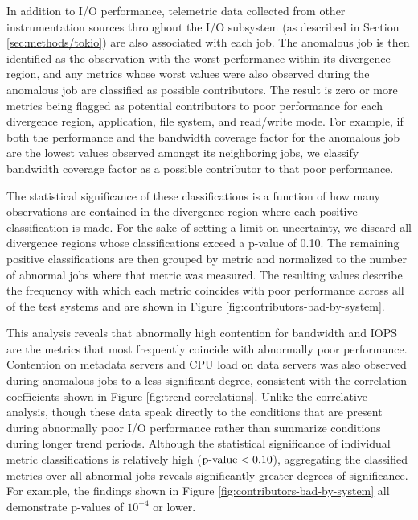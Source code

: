 In addition to I/O performance, telemetric data collected from other instrumentation sources throughout the I/O subsystem (as described in Section \ref{sec:methods/tokio}) are also associated with each job.
The anomalous job is then identified as the observation with the worst performance within its divergence region, and any metrics whose worst values were also observed during the anomalous job are classified as possible contributors.
The result is zero or more metrics being flagged as potential contributors to poor performance for each divergence region, application, file system, and read/write mode. For example, if both the performance and the bandwidth coverage factor for the anomalous job are the lowest values observed amongst its neighboring jobs, we classify bandwidth coverage factor as a possible contributor to that poor performance.


The statistical significance of these classifications is a function of how many observations are contained in the divergence region where each positive classification is made.
For the sake of setting a limit on uncertainty, we discard all divergence regions whose classifications exceed a p-value of 0.10. 
The remaining positive classifications are then grouped by metric and normalized to the number of abnormal jobs where that metric was measured.
The resulting values describe the frequency with which each metric coincides with poor performance across all of the test systems and are shown in Figure \ref{fig:contributors-bad-by-system}.

This analysis reveals that abnormally high contention for bandwidth and IOPS are the metrics that most frequently coincide with abnormally poor performance.
Contention on metadata servers and CPU load on data servers was also observed during anomalous jobs to a less significant degree, consistent with the correlation coefficients shown in Figure \ref{fig:trend-correlations}.
Unlike the correlative analysis, though these data speak directly to the conditions that are present during abnormally poor I/O performance rather than summarize conditions during longer trend periods.
Although the statistical significance of individual metric classifications is relatively high (${\textup{p-value} < 0.10}$), aggregating the classified metrics over all abnormal jobs reveals significantly greater degrees of significance.
For example, the findings shown in Figure \ref{fig:contributors-bad-by-system} all demonstrate p-values of $10^{-4}$ or lower.





